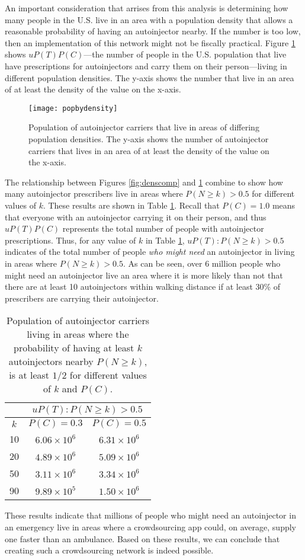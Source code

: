 An important consideration that arrises from this analysis is determining how many people in the U.S. live in an area with a population density that allows a reasonable probability of having an autoinjector nearby. If the number is too low, then an implementation of this network might not be fiscally practical. Figure \ref{fig:popbydensity} shows $uP(T)P(C)$---the number of people in the U.S. population that live have prescriptions for autoinjectors and carry them on their person---living in different population densities. The y-axis shows the number that live in an area of at least the density of the value on the x-axis.

\begin{figure}[h]
\centering
\texttt{[image: popbydensity]}
\caption{Population of autoinjector carriers that live in areas of differing population densities. The y-axis shows the number of autoinjector carriers that lives in an area of at least the density of the value on the x-axis.}
\label{fig:popbydensity}
\end{figure}

The relationship between Figures \ref{fig:denscomp} and \ref{fig:popbydensity} combine to show how many autoinjector prescribers live in areas where $P(N \geq k) > 0.5$ for different values of $k$. These results are shown in Table \ref{tab:probsforks}. Recall that $P(C) = 1.0$ means that everyone with an autoinjector carrying it on their person, and thus $uP(T)P(C)$ represents the total number of people with autoinjector prescriptions. Thus, for any value of $k$ in Table \ref{tab:probsforks}, $uP(T) : P(N\geq k) > 0.5$ indicates of the total number of people \textit{who might need} an autoinjector in living in areas where $P(N \geq k) > 0.5$. As can be seen, over 6 million people who might need an autoinjector live an area where it is more likely than not that there are at least 10 autoinjectors within walking distance if at least 30\% of prescribers are carrying their autoinjector.

\begin{table}[h]
\centering
\begin{tabular} {|c||c|c|}
    \hline
    & \multicolumn{2}{|c|}{$uP(T) : P(N\geq k) > 0.5$} \\\hline
    $k$ & $P(C) = 0.3$ & $P(C) = 0.5$ \\\hline\hline
    10 & $6.06 \times 10^{6}$ & $6.31 \times 10^{6}$ \\\hline
    20 & $4.89 \times 10^{6}$ & $5.09 \times 10^{6}$ \\\hline
    50 & $3.11 \times 10^{6}$ & $3.34 \times 10^{6}$ \\\hline
    90 & $9.89 \times 10^{5}$ & $1.50 \times 10^{6}$ \\\hline 
\end{tabular}
\caption{Population of autoinjector carriers living in areas where the probability of having at least $k$ autoinjectors nearby $P(N \geq k)$, is at least $1/2$ for different values of $k$ and $P(C)$.}
\label{tab:probsforks}
\end{table}

These results indicate that millions of people who might need an autoinjector in an emergency live in areas where a crowdsourcing app could, on average, supply one faster than an ambulance. Based on these results, we can conclude that creating such a crowdsourcing network is indeed possible.